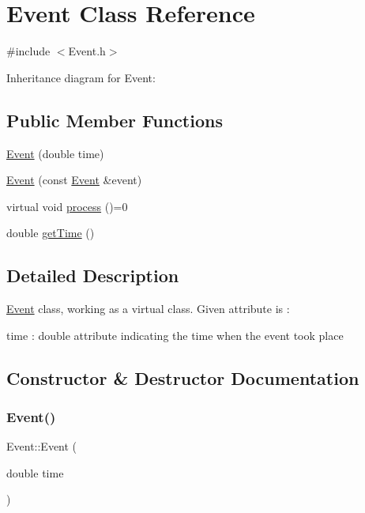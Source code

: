 \hypertarget{classEvent}{}\section{Event Class Reference}
\label{classEvent}


{\ttfamily \#include $<$Event.\+h$>$}



Inheritance diagram for Event\+:
\subsection*{Public Member Functions}
\begin{DoxyCompactItemize}
\item 
\hyperlink{classEvent_aebd4c54256dbf46040053babdfcdf987}{Event} (double time)
\item 
\hyperlink{classEvent_ae8b35bf9237b74824194f87128e4fdab}{Event} (const \hyperlink{classEvent}{Event} \&event)
\item 
virtual void \hyperlink{classEvent_af1940e82c4da67c8119f0dfe026949b4}{process} ()=0
\item 
double \hyperlink{classEvent_ab05b23f7cc8d126efcbf189062f3b275}{get\+Time} ()
\end{DoxyCompactItemize}


\subsection{Detailed Description}
\hyperlink{classEvent}{Event} class, working as a virtual class. Given attribute is \+:
\begin{DoxyItemize}
\item time \+: double attribute indicating the time when the event took place 
\end{DoxyItemize}

\subsection{Constructor \& Destructor Documentation}
\mbox{\label{classEvent_aebd4c54256dbf46040053babdfcdf987}} 
\subsubsection{\texorpdfstring{Event()}{Event()}\hspace{0.1cm}{\footnotesize\ttfamily [1/2]}}
{\footnotesize\ttfamily Event\+::\+Event (\begin{DoxyParamCaption}\item[{double}]{time }\end{DoxyParamCaption})\hspace{0.3cm}{\ttfamily [explicit]}}

